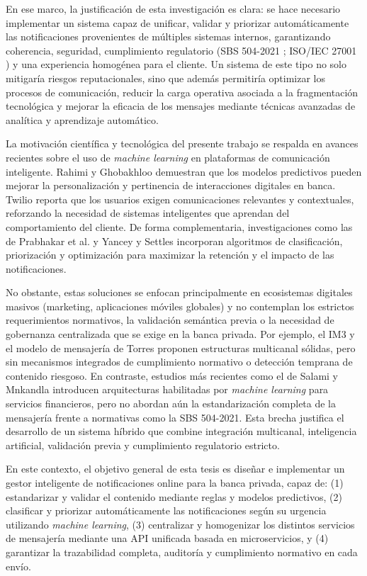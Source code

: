 \documentclass[conference]{IEEEtran}
\begin{document}
En ese marco, la justificación de esta investigación es clara: se hace necesario implementar un sistema capaz de unificar, validar y priorizar automáticamente las notificaciones provenientes de múltiples sistemas internos, garantizando coherencia, seguridad, cumplimiento regulatorio (SBS 504-2021 \cite{sbs2021}; ISO/IEC 27001 \cite{iso27001}) y una experiencia homogénea para el cliente. Un sistema de este tipo no solo mitigaría riesgos reputacionales, sino que además permitiría optimizar los procesos de comunicación, reducir la carga operativa asociada a la fragmentación tecnológica y mejorar la eficacia de los mensajes mediante técnicas avanzadas de analítica y aprendizaje automático.

La motivación científica y tecnológica del presente trabajo se respalda en avances recientes sobre el uso de \textit{machine learning} en plataformas de comunicación inteligente. Rahimi y Ghobakhloo \cite{rahimi2021} demuestran que los modelos predictivos pueden mejorar la personalización y pertinencia de interacciones digitales en banca. Twilio \cite{twilio2023} reporta que los usuarios exigen comunicaciones relevantes y contextuales, reforzando la necesidad de sistemas inteligentes que aprendan del comportamiento del cliente. De forma complementaria, investigaciones como las de Prabhakar et al. \cite{prabhakar2022} y Yancey y Settles \cite{yancey2020} incorporan algoritmos de clasificación, priorización y optimización para maximizar la retención y el impacto de las notificaciones.

No obstante, estas soluciones se enfocan principalmente en ecosistemas digitales masivos (marketing, aplicaciones móviles globales) y no contemplan los estrictos requerimientos normativos, la validación semántica previa o la necesidad de gobernanza centralizada que se exige en la banca privada. Por ejemplo, el IM3 \cite{liu2011} y el modelo de mensajería de Torres \cite{torres2020} proponen estructuras multicanal sólidas, pero sin mecanismos integrados de cumplimiento normativo o detección temprana de contenido riesgoso. En contraste, estudios más recientes como el de Salami y Mnkandla \cite{salami2022} introducen arquitecturas habilitadas por \textit{machine learning} para servicios financieros, pero no abordan aún la estandarización completa de la mensajería frente a normativas como la SBS 504-2021. Esta brecha justifica el desarrollo de un sistema híbrido que combine integración multicanal, inteligencia artificial, validación previa y cumplimiento regulatorio estricto.

En este contexto, el objetivo general de esta tesis es diseñar e implementar un gestor inteligente de notificaciones online para la banca privada, capaz de:
(1) estandarizar y validar el contenido mediante reglas y modelos predictivos,
(2) clasificar y priorizar automáticamente las notificaciones según su urgencia utilizando \textit{machine learning},
(3) centralizar y homogenizar los distintos servicios de mensajería mediante una API unificada basada en microservicios, y
(4) garantizar la trazabilidad completa, auditoría y cumplimiento normativo en cada envío.
\end{document}
